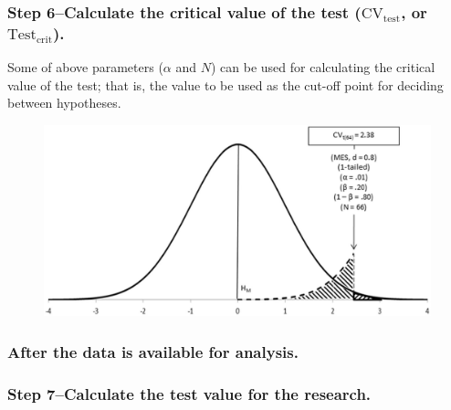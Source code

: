 \documentclass[
]{book}
\theoremstyle{definition}
\theoremstyle{definition}
\theoremstyle{definition}
\theoremstyle{definition}
\theoremstyle{remark}
\begin{document}
\hypertarget{step-6calculate-the-critical-value-of-the-test-mboxcv_mboxtest-or-mboxtest_mboxcrit.}{%
\subsubsection*{\texorpdfstring{Step 6--Calculate the critical value of the test (\(\mbox{CV}_{\mbox{test}}\), or \(\mbox{Test}_{\mbox{crit}}\)).}{Step 6--Calculate the critical value of the test (\textbackslash mbox\{CV\}\_\{\textbackslash mbox\{test\}\}, or \textbackslash mbox\{Test\}\_\{\textbackslash mbox\{crit\}\}).}}\label{step-6calculate-the-critical-value-of-the-test-mboxcv_mboxtest-or-mboxtest_mboxcrit.}}

Some of above parameters (\(\alpha\) and \(N\)) can be used for calculating the critical value of the test; that is, the value to be used as the cut-off point for deciding between hypotheses.

\begin{figure}

{\centering \includegraphics[width=0.6\linewidth]{images/Perezgonzalez2015Fig5} 

}

\end{figure}

\hypertarget{after-the-data-is-available-for-analysis.}{%
\subsubsection*{After the data is available for analysis.}\label{after-the-data-is-available-for-analysis.}}

\hypertarget{step-7calculate-the-test-value-for-the-research.}{%
\subsubsection*{Step 7--Calculate the test value for the research.}\label{step-7calculate-the-test-value-for-the-research.}}
\end{document}
